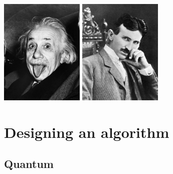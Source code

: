 \documentclass[aspectratio=169]{beamer}
\begin{document}
\begin{frame}
  \begin{center}
    \includegraphics[width=0.3\textwidth]{figures/einstein_tongue.jpg}
    \hspace{0.1cm}
    \includegraphics[width=0.3\textwidth]{figures/tesla_chair.jpg}
  \end{center}
\end{frame}

\section{Designing an algorithm}

\subsection{Quantum}
\end{document}
